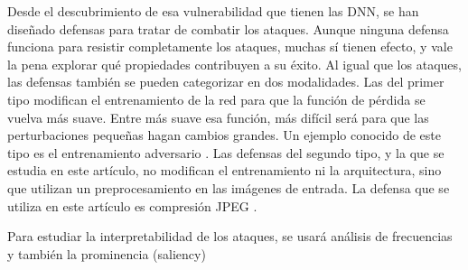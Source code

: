 Desde el descubrimiento de esa vulnerabilidad que tienen las DNN, se han diseñado defensas para tratar de combatir los ataques. Aunque ninguna defensa funciona para resistir completamente los ataques, muchas sí tienen efecto, y vale la pena explorar qué propiedades contribuyen a su éxito. Al igual que los ataques, las defensas también se pueden categorizar en dos modalidades. Las del primer tipo modifican el entrenamiento de la red para que la función de pérdida se vuelva más suave. Entre más suave esa función, más difícil será para que las perturbaciones pequeñas hagan cambios grandes. Un ejemplo conocido de este tipo es el entrenamiento adversario \cite{goodfellow2015explaining, Shaham_2018, szegedy2014intriguing}. Las defensas del segundo tipo, y la que se estudia en este artículo, no modifican el entrenamiento ni la arquitectura, sino que utilizan un preprocesamiento en las imágenes de entrada. La defensa que se utiliza en este artículo es compresión JPEG \cite{das2017keeping}.

Para estudiar la interpretabilidad de los ataques, se usará análisis de frecuencias y también la prominencia (saliency) \cite{simonyan2014deep}




